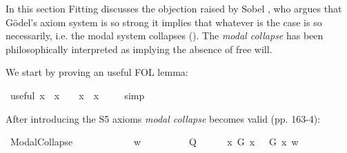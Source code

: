 \begin{isabellebody}
{\isafoldproof}%
%
\isadelimproof
%
\endisadelimproof
%
\isamarkuptrue%
%
\begin{isamarkuptext}%
In this section Fitting discusses the objection raised by Sobel \cite{sobel2004logic}, who argues that G\"odel's axiom system
 is so strong it implies that whatever is the case is so necessarily, i.e. the modal system collapses (\isa{{\isasymphi}\ {\isasymlongrightarrow}\ {\isasymbox}{\isasymphi}}).
 The \emph{modal collapse} has been philosophically interpreted as implying the absence of free will.%
\end{isamarkuptext}\isamarkuptrue%
%
\begin{isamarkuptext}%
We start by proving an useful FOL lemma:%
\end{isamarkuptext}\isamarkuptrue%
\isamarkupfalse%
\ useful{\isacharcolon}\ {\isachardoublequoteopen}{\isacharparenleft}{\isasymforall}x{\isachardot}\ {\isasymphi}\ x\ {\isasymlongrightarrow}\ {\isasympsi}{\isacharparenright}\ {\isasymLongrightarrow}\ {\isacharparenleft}{\isacharparenleft}{\isasymexists}x{\isachardot}\ {\isasymphi}\ x{\isacharparenright}\ {\isasymlongrightarrow}\ {\isasympsi}{\isacharparenright}{\isachardoublequoteclose}%
\isadelimproof
\ %
\endisadelimproof
%
\isatagproof
{}\isamarkupfalse%
\ simp%
\endisatagproof
{\isafoldproof}%
%
\isadelimproof
%
\endisadelimproof
%
\begin{isamarkuptext}%
After introducing the S5 axioms \emph{modal collapse} becomes valid (pp. 163-4):%
\end{isamarkuptext}\isamarkuptrue%
\isamarkupfalse%
\ ModalCollapse{\isacharcolon}\ {\isachardoublequoteopen}{\isasymlfloor}\isactrlbold {\isasymforall}{\isasymPhi}{\isachardot}{\isacharparenleft}{\isasymPhi}\ \isactrlbold {\isasymrightarrow}\ {\isacharparenleft}\isactrlbold {\isasymbox}\ {\isasymPhi}{\isacharparenright}{\isacharparenright}{\isasymrfloor}{\isachardoublequoteclose}\isanewline
%
\isadelimproof
%
\endisadelimproof
%
\isatagproof
{}\isamarkupfalse%
\ {\isacharminus}\isanewline
\ \ \isacommand{{\isacharbraceleft}}\isamarkupfalse%
\isanewline
\ \ \isamarkupfalse%
\ w\isanewline
\ \ \ \isacommand{{\isacharbraceleft}}\isamarkupfalse%
\isanewline
\ \ \ \ \isamarkupfalse%
\ Q\isanewline
\ \ \ \ \isamarkupfalse%
\ {\isachardoublequoteopen}{\isacharparenleft}\isactrlbold {\isasymforall}x{\isachardot}\ G\ x\ \isactrlbold {\isasymrightarrow}\ {\isacharparenleft}{\isasymE}\ G\ x{\isacharparenright}{\isacharparenright}\ w{\isachardoublequoteclose}\ \isamarkupfalse%

\end{isabellebody}
